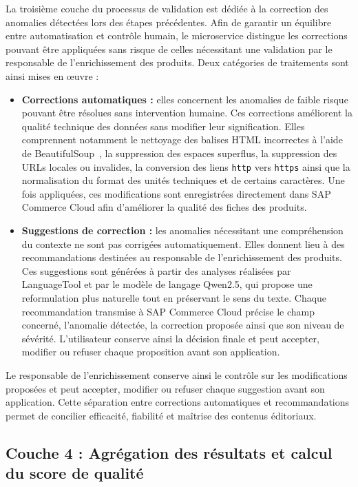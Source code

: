 La troisième couche du processus de validation est dédiée à la correction des anomalies détectées lors des étapes précédentes. Afin de garantir un équilibre entre automatisation et contrôle humain, le microservice distingue les corrections pouvant être appliquées sans risque de celles nécessitant une validation par le responsable de l'enrichissement des produits. Deux catégories de traitements sont ainsi mises en œuvre :

\begin{itemize}
    \item \textbf{Corrections automatiques :} elles concernent les anomalies de faible risque pouvant être résolues sans intervention humaine. Ces corrections améliorent la qualité technique des données sans modifier leur signification. Elles comprennent notamment le nettoyage des balises HTML incorrectes à l'aide de BeautifulSoup~, la suppression des espaces superflus, la suppression des URLs locales ou invalides, la conversion des liens \texttt{http} vers \texttt{https} ainsi que la normalisation du format des unités techniques et de certains caractères. Une fois appliquées, ces modifications sont enregistrées directement dans SAP Commerce Cloud afin d'améliorer la qualité des fiches des produits.

    \item \textbf{Suggestions de correction :} les anomalies nécessitant une compréhension du contexte ne sont pas corrigées automatiquement. Elles donnent lieu à des recommandations destinées au responsable de l'enrichissement des produits. Ces suggestions sont générées à partir des analyses réalisées par LanguageTool et par le modèle de langage Qwen2.5, qui propose une reformulation plus naturelle tout en préservant le sens du texte. Chaque recommandation transmise à SAP Commerce Cloud précise le champ concerné, l'anomalie détectée, la correction proposée ainsi que son niveau de sévérité. L'utilisateur conserve ainsi la décision finale et peut accepter, modifier ou refuser chaque proposition avant son application.
\end{itemize}

Le responsable de l'enrichissement conserve ainsi le contrôle sur les modifications proposées et peut accepter, modifier ou refuser chaque suggestion avant son application. Cette séparation entre corrections automatiques et recommandations permet de concilier efficacité, fiabilité et maîtrise des contenus éditoriaux.
\subsection{Couche 4 : Agrégation des résultats et calcul du score de qualité}

